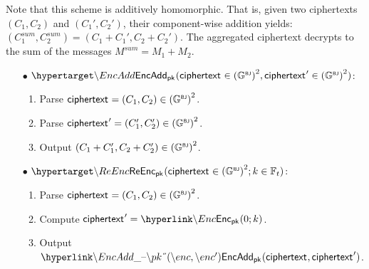 Note that this scheme is additively homomorphic. That is, given two ciphertexts $(C_1, C_2)$ and $(C_1', C_2')$, their component-wise addition yields: $(C_1^{sum}, C_2^{sum}) = (C_1 + C_1', C_2 + C_2')$. The aggregated ciphertext decrypts to the sum of the messages $M^{sum} = M_1 + M_2$.



\begin{mdframed}
	\begin{minipage}[t]{0.53\textwidth}
		\begin{itemize}
			\item[$\bullet$] $\hlset{\EncAdd}_{\pk}(\enc \in {(\BJ{\G})}^2, \enc' \in {(\BJ{\G})}^2)$:
			\begin{enumerate}
				\item Parse ${\sf{ciphertext}^{}} = (C_1, C_2) \in {(\ensuremath{{\mathbb{G}}^{\text{\tiny \sf BJ}}})}^2$.
				\item Parse ${\sf{ciphertext}^{}}' = (C_1', C_2') \in {(\ensuremath{{\mathbb{G}}^{\text{\tiny \sf BJ}}})}^2$.
				\item Output $(C_1 + C_1', C_2 + C_2') \in {(\ensuremath{{\mathbb{G}}^{\text{\tiny \sf BJ}}})}^2$.
			\end{enumerate}
		\end{itemize}
	\end{minipage}
	\begin{minipage}[t]{0.45\textwidth}
		\begin{itemize}
			\item[$\bullet$] $\hlset{\ReEnc}_{\pk}(\enc \in {(\BJ{\G})}^2; k\in\F_t)$: \vspace{0.1cm}
			\begin{enumerate}
				\item Parse ${\sf{ciphertext}^{}} = (C_1, C_2) \in {(\ensuremath{{\mathbb{G}}^{\text{\tiny \sf BJ}}})}^2$.
				\item Compute $\enc' = \hlget{\Enc}_{\pk}(0; k)$.
				\item Output $\hlget{\EncAdd_{\pk}(\enc, \enc')}$.
			\end{enumerate}
		\end{itemize}
	\end{minipage}
\end{mdframed}

